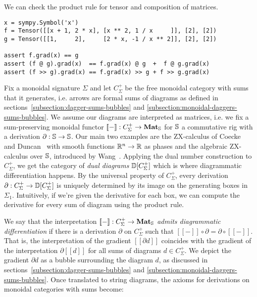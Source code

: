 \begin{example}
We can check the product rule for tensor and composition of matrices.

\begin{verbatim}
x = sympy.Symbol('x')
f = Tensor([[x + 1, 2 * x], [x ** 2, 1 / x     ]], [2], [2])
g = Tensor([[1,     2],     [2 * x, -1 / x ** 2]], [2], [2])

assert f.grad(x) == g
assert (f @ g).grad(x)  == f.grad(x) @ g  +  f @ g.grad(x)
assert (f >> g).grad(x) == f.grad(x) >> g + f >> g.grad(x)
\end{verbatim}
\end{example}

Fix a monoidal signature $\Sigma$ and let $C_\Sigma^+$ be the free monoidal category with sums that it generates, i.e. arrows are formal sums of diagrams as defined in sections~\ref{subsection:dagger-sums-bubbles} and \ref{subsection:monoidal-daggers-sums-bubbles}.
We assume our diagrams are interpreted as matrices, i.e. we fix a sum-preserving monoidal functor $[\![-]\!]  : C_\Sigma^+ \to \mathbf{Mat}_\S$ for $\S$ a commutative rig with a derivation $\partial : \S \to \S$.
Our main two examples are the ZX-calculus of Coecke and Duncan~\cite{CoeckeDuncan08} with smooth functions $\R^n \to \R$ as phases and the algebraic ZX-calculus over $\S$, introduced by Wang~\cite{Wang20}.
Applying the dual number construction to $C_\Sigma^+$, we get the category of \emph{dual diagrams} $\D[C_\Sigma^+]$ which is where diagrammatic differentiation happens.
By the universal property of $C_\Sigma^+$, every derivation $\partial : C_\Sigma^+ \to \D[C_\Sigma^+]$ is uniquely determined by its image on the generating boxes in $\Sigma_1$.
Intuitively, if we're given the derivative for each box, we can compute the derivative for every sum of diagram using the product rule.

We say that the interpretation $[\![-]\!] : C_\Sigma^+ \to \mathbf{Mat}_\S$ \emph{admits diagrammatic differentiation} if there is a derivation $\partial$ on $C_\Sigma^+$ such that $[\![-]\!] \circ \partial = \partial \circ [\![-]\!]$.
That is, the interpretation of the gradient $[\![\partial d]\!]$ coincides with the gradient of the interpretation $\partial [\![d]\!]$ for all sums of diagrams $d \in C_\Sigma^+$.
We depict the gradient $\partial d$ as a bubble surrounding the diagram $d$, as discussed in sections~\ref{subsection:dagger-sums-bubbles} and \ref{subsection:monoidal-daggers-sums-bubbles}.
Once translated to string diagrams, the axioms for derivations on monoidal
categories with sums become:

